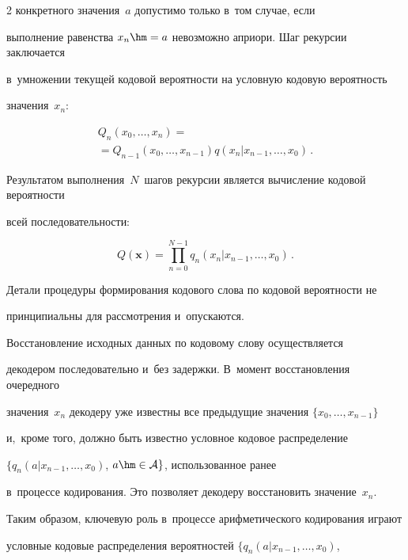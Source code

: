 \begin{multicols}{2}
 конкретного значения~$a$ допустимо только в~том случае, если 

 выполнение равенства $x_n\hm=a$ невозможно априори. Шаг рекурсии заключается 

 в~умножении текущей кодовой вероятности на условную кодовую вероятность 

 значения~$x_n$:

\begin{multline*}

Q_n\left(x_0,\dots,x_n\right)={}\\

{}=Q_{n-1}\left(x_0,\dots,x_{n-1}\right)

q\left(x_n|x_{n-1},\dots,x_0\right)\,.

\end{multline*}

Результатом выполнения~$N$~шагов рекурсии является вычисление кодовой вероятности 

всей последовательности:

\begin{equation}

\label{eq3}

Q(\mathbf{x}) =\prod\limits_{n=0}^{N-1} q_n\left(x_n|x_{n-1},\dots,x_0\right)\,.

\end{equation}

Детали процедуры формирования кодового слова по кодовой вероятности не 

принципиальны для рассмотрения и~опускаются.



Восстановление исходных данных по кодовому слову осуществляется 

декодером последовательно и~без задержки. В~момент восстановления очередного 

значения~$x_n$ декодеру уже известны все предыдущие значения $\{x_0,\dots,x_{n-1}\}$ 

и,~кроме того, должно быть известно условное кодовое распределение 

$\{q_n(a|x_{n-1},\dots,x_0)$, $a\hm\in{\cal A}\}$, использованное ранее 

в~процессе кодирования. Это позволяет декодеру восстановить значение~$x_n$.



Таким образом, ключевую роль в~процессе арифметического кодирования играют 

условные кодовые распределения вероятностей $\{q_n(a|x_{n-1},\dots,x_0)$,


\end{multicols}
